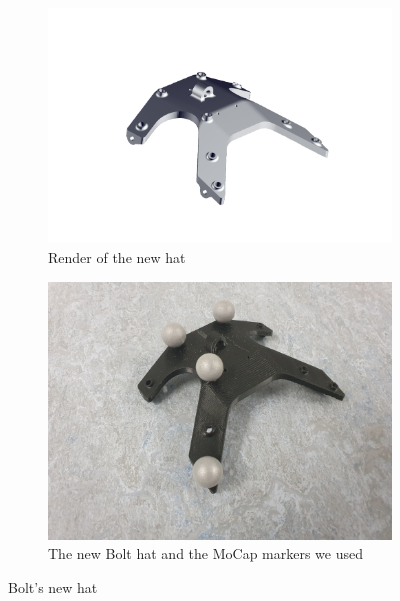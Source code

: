 \documentclass[a4paper,10pt]{article}
\begin{document}
\begin{figure}[H]
\label{fig:new_bolt_hat}
\centering

\begin{subfigure}{.5\textwidth}
\centering
  \includegraphics[width=1\linewidth, angle=0, scale=1.2]{./images/render_top.png}
  \caption{Render of the new hat}
\end{subfigure}%
\begin{subfigure}{.5\textwidth}
\centering
  \includegraphics[width=\linewidth, angle=0, scale=0.9]{./images/Bolt_hat.jpg}
  \caption{The new Bolt hat and the MoCap markers we used}
\end{subfigure}
\caption{Bolt's new hat}
\end{figure}
\end{document}
